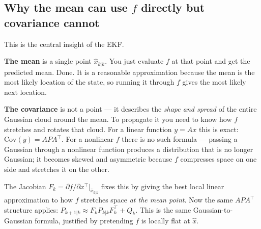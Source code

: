 \documentclass[12pt, a4paper]{article}
\begin{document}
\subsection*{Why the mean can use $f$ directly but covariance cannot}

This is the central insight of the EKF.

\textbf{The mean} is a single point $\hat{x}_{k|k}$.
You just evaluate $f$ at that point and get the predicted mean.
Done. It is a reasonable approximation because the mean is the most
likely location of the state, so running it through $f$ gives the
most likely next location.

\textbf{The covariance} is not a point --- it describes the
\emph{shape and spread} of the entire Gaussian cloud around the mean.
To propagate it you need to know how $f$ stretches and rotates that
cloud.
For a linear function $y = Ax$ this is exact: $\mathrm{Cov}(y) = A P A^\top$.
For a nonlinear $f$ there is no such formula --- passing a Gaussian
through a nonlinear function produces a distribution that is no longer
Gaussian; it becomes skewed and asymmetric because $f$ compresses
space on one side and stretches it on the other.

The Jacobian $F_k = \partial f/\partial x^\top\big|_{\hat{x}_{k|k}}$
fixes this by giving the best local linear approximation to how $f$
stretches space \emph{at the mean point}.
Now the same $A P A^\top$ structure applies:
$P_{k+1|k} \approx F_k P_{k|k} F_k^\top + Q_k$.
This is the same Gaussian-to-Gaussian formula, justified by
pretending $f$ is locally flat at $\hat{x}$.
\end{document}
